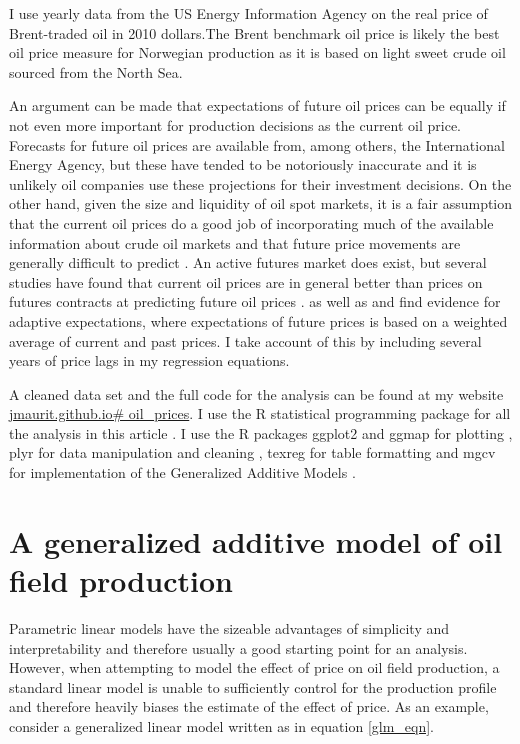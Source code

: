 \documentclass[12pt]{article}
\begin{document}
I use yearly data from the US Energy Information Agency on the real price of Brent-traded oil in 2010 dollars.The Brent benchmark oil price is likely the best oil price measure for Norwegian production as it is based on light sweet crude oil sourced from the North Sea.  

An argument can be made that expectations of future oil prices can be equally if not even more important for production decisions as the current oil price.  Forecasts for future oil prices are available from, among others, the International Energy Agency, but these have tended to be notoriously inaccurate and it is unlikely oil companies use these projections for their investment decisions.  On the other hand, given the size and liquidity of oil spot markets, it is a fair assumption that the current oil prices do a good job of incorporating much of the available information about crude oil markets and that future price movements are generally difficult to predict \citet{hamilton_understanding_2008}.  An active futures market does exist, but several studies have found that current oil prices are in general better than prices on futures contracts at predicting future oil prices \citep{alquist_what_2010, chinn_predictive_2005}.  \citet{mohn_investment_2008} as well as \citet{pesaran_econometric_1990} and \citet{farzin_impact_2001} find evidence for adaptive expectations, where expectations of future prices is based on a weighted average of current and past prices.  I take account of this by including several years of price lags in my regression equations.  

A cleaned data set and the full code for the analysis can be found at my website \url{jmaurit.github.io# oil_prices}. I use the R statistical programming package for all the analysis in this article \citep{r_core_team_r:_2013}.  I use the R packages ggplot2 and ggmap for plotting \citep{wickham_ggplot2:_2009, kahle_ggmap:_2013}, plyr for data manipulation and cleaning \citep{wickham_split-apply-combine_2011}, texreg for table formatting \citep{leifeld_texreg:_2013} and mgcv for implementation of the Generalized Additive Models \citep{wood_fast_2011}.

\section{A generalized additive model of oil field production}
Parametric linear models have the sizeable advantages of simplicity and interpretability and therefore usually a good starting point for an analysis.  However, when attempting to model the effect of price on oil field production, a standard linear model is unable to sufficiently control for the production profile and therefore heavily biases the estimate of the effect of price.  As an example, consider a generalized linear model written as in equation \ref{glm_eqn}. 
\end{document}
